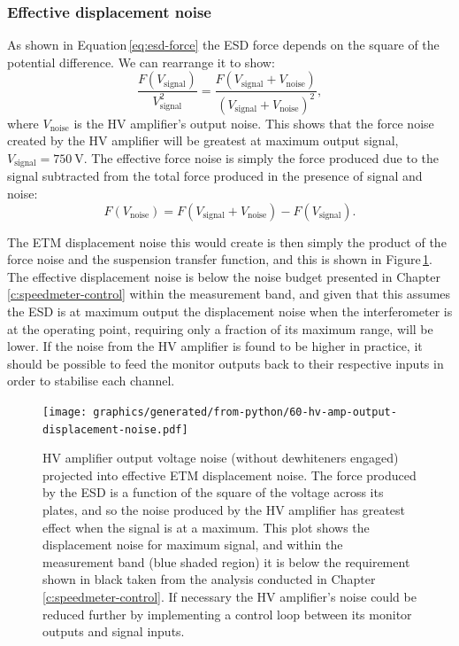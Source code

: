 \subsubsection{Effective displacement noise}
As shown in Equation\,\ref{eq:esd-force} the \gls{ESD} force depends on the square of the potential difference. We can rearrange it to show:
\begin{equation}
  \frac{F \left( V_{\text{signal}} \right)}{V_{\text{signal}}^2} = \frac{F \left( V_{\text{signal}} + V_{\text{noise}} \right)}{\left( V_{\text{signal}} + V_{\text{noise}} \right)^2},
\end{equation}
where $V_{\text{noise}}$ is the \gls{HV} amplifier's output noise. This shows that the force noise created by the \gls{HV} amplifier will be greatest at maximum output signal, $V_{\text{signal}} = \SI{750}{\volt}$. The effective force noise is simply the force produced due to the signal subtracted from the total force produced in the presence of signal and noise:
\begin{equation}
  F \left( V_{\text{noise}} \right) = F \left( V_{\text{signal}} + V_{\text{noise}} \right) - F \left( V_{\text{signal}} \right).
\end{equation}

The \gls{ETM} displacement noise this would create is then simply the product of the force noise and the suspension transfer function, and this is shown in Figure\,\ref{fig:hv-amp-output-displacement-noise}. The effective displacement noise is below the noise budget presented in Chapter\,\ref{c:speedmeter-control} within the measurement band, and given that this assumes the \gls{ESD} is at maximum output the displacement noise when the interferometer is at the operating point, requiring only a fraction of its maximum range, will be lower. If the noise from the \gls{HV} amplifier is found to be higher in practice, it should be possible to feed the monitor outputs back to their respective inputs in order to stabilise each channel.

\begin{figure}
  \centering
  \texttt{[image: graphics/generated/from-python/60-hv-amp-output-displacement-noise.pdf]}
  \caption[High voltage amplifier output projected end test mass displacement noise]{\gls{HV} amplifier output voltage noise (without dewhiteners engaged) projected into effective \gls{ETM} displacement noise. The force produced by the \gls{ESD} is a function of the square of the voltage across its plates, and so the noise produced by the \gls{HV} amplifier has greatest effect when the signal is at a maximum. This plot shows the displacement noise for maximum signal, and within the measurement band (blue shaded region) it is below the requirement shown in black taken from the analysis conducted in Chapter\,\ref{c:speedmeter-control}. If necessary the \gls{HV} amplifier's noise could be reduced further by implementing a control loop between its monitor outputs and signal inputs.}
  \label{fig:hv-amp-output-displacement-noise}
\end{figure}

